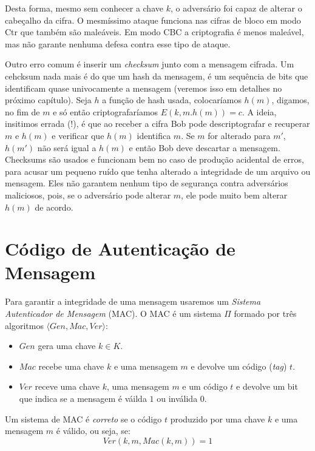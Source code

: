 Desta forma, mesmo sem conhecer a chave $k$, o adversário foi capaz de alterar o cabeçalho da cifra.
O mesmíssimo ataque funciona nas cifras de bloco em modo Ctr que também são maleáveis.
Em modo CBC a criptografia é menos maleável, mas não garante nenhuma defesa contra esse tipo de ataque.

Outro erro comum é inserir um {\em checksum} junto com a mensagem cifrada.
Um cehcksum nada mais é do que um hash da mensagem, é um sequência de bits que identificam quase univocamente a mensagem (veremos isso em detalhes no próximo capítulo).
Seja $h$ a função de hash usada, colocaríamos $h(m)$, digamos, no fim de $m$ e só então criptografaríamos $E(k, m.h(m)) = c$.
A ideia, insitimos errada (!), é que ao receber a cifra Bob pode descriptografar e recuperar $m$ e $h(m)$ e verificar que $h(m)$ identifica $m$.
Se $m$ for alterado para $m'$, $h(m')$ não será igual a $h(m)$ e então Bob deve descartar a mensagem.
Checksums são usados e funcionam bem no caso de produção acidental de erros, para acusar um pequeno ruído que tenha alterado a integridade de um arquivo ou mensagem.
Eles não garantem nenhum tipo de segurança contra adversários maliciosos, pois, se o adversário pode alterar $m$, ele pode muito bem alterar $h(m)$ de acordo.


\section{Código de Autenticação de Mensagem}
\label{sec:mac}

Para garantir a integridade de uma mensagem usaremos um {\em Sistema Autenticador de Mensagem} (MAC).
O MAC é um sistema $\Pi$ formado por três algoritmos $\langle Gen, Mac, Ver \rangle$:
\begin{itemize}
\item $Gen$ gera uma chave $k \in K$.
\item $Mac$ recebe uma chave $k$ e uma mensagem $m$ e devolve um código ({\em tag}) $t$.
\item $Ver$ receve uma chave $k$, uma mensagem $m$ e um código $t$ e devolve um bit que indica se a mensagem é váilda $1$ ou inválida $0$.
\end{itemize}

Um sistema de MAC é {\em correto} se o código $t$ produzido por uma chave $k$ e uma mensagem $m$ é válido, ou seja, se:
\begin{displaymath}
  Ver(k, m, Mac(k,m)) = 1
\end{displaymath}

